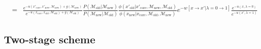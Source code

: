 \documentclass[aps,pre,twocolumn,nofootinbib,superscriptaddress,linenumbers,11point]{revtex4-1}
\begin{document}
\begin{widetext}
\begin{eqnarray}
&=& \frac{e^{-u(x'_\mathrm{core}, x'_\mathrm{new}, \mathcal{M}_\mathrm{new}) + g(\mathcal{M}_\mathrm{new})}}{e^{-u(x_\mathrm{core}, x_\mathrm{old}, \mathcal{M}_\mathrm{old}) + g(\mathcal{M}_\mathrm{old})}} \frac{P(\mathcal{M}_\mathrm{old} | \mathcal{M}_\mathrm{new})}{P(\mathcal{M}_\mathrm{new} | \mathcal{M}_\mathrm{old})} \frac{\phi(x'_\mathrm{old} | x'_\mathrm{core}, \mathcal{M}_\mathrm{new}, \mathcal{M}_\mathrm{old})}{\phi(x_\mathrm{new} | x_\mathrm{core}, \mathcal{M}_\mathrm{old}, \mathcal{M}_\mathrm{new})} e^{-w[x \rightarrow x' | \lambda = 0 \rightarrow 1]} \frac{e^{-u(x, \lambda=0)}}{e^{-u(x', \lambda=1)}} \label{equation:hybrid-acceptance-criteria}
\end{eqnarray}
\end{widetext}

\subsection*{Two-stage scheme}
\end{document}
